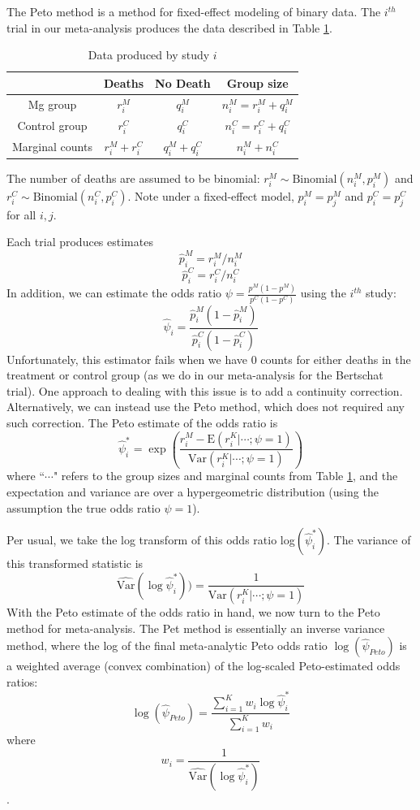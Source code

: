 \documentclass[fleqn,10pt]{SelfArx} %
\begin{document}
The Peto method is a method for fixed-effect modeling of binary data. The $i^{th}$ trial in our meta-analysis produces the data described in Table \ref{tab:sld}. 
\bgroup
\def\arraystretch{1.2}
\begin{table}[H]
\caption{Data produced by study $i$} \label{tab:sld}
\begin{center}
\begin{tabular}{| c | c | c | c |}
\hline
	& Deaths & No Death & Group size \\
\hline
Mg group &  $r_i^M$ & $q_i^M$ & $n_i^M = r_i^M + q_i^M$\\
\hline
Control group &  $r_i^C$ & $q_i^C$ & $n_i^C = r_i^C + q_i^C$  \\
\hline
Marginal counts & $r_i^M + r_i^C$ & $q_i^M + q_i^C$ & $n_i^M + n_i^C$ \\
\hline
\end{tabular}
\end{center}
\end{table}
\egroup
The number of deaths are assumed to be binomial: $r_i^M \sim \textrm{Binomial}(n_i^M, p_i^M)$ and $r_i^C \sim \textrm{Binomial}(n_i^C, p_i^C)$. Note under a fixed-effect model, $p_i^M = p_j^M$ and $p_i^C = p_j^C$ for all $i, j$.

Each trial produces estimates
\[\hat{p}_i^M = r_i^M/n_i^M\]
\[\hat{p}_i^C = r_i^C / n_i^C\]
In addition, we can estimate the odds ratio $\psi = \frac{p^M (1- p^M)}{p^C (1 - p^C)}$ using the $i^{th}$ study:
\[\hat{\psi}_i = \frac{\hat{p}_i^M(1-\hat{p}_i^M)}{\hat{p}_i^C(1-\hat{p}_i^C)}\]
Unfortunately, this estimator fails when we have 0 counts for either deaths in the treatment or control group (as we do in our meta-analysis for the Bertschat trial). One approach to dealing with this issue is to add a continuity correction. Alternatively, we can instead use the Peto method, which does not required any such correction. The Peto estimate of the odds ratio is
\[\hat{\psi}_i^* = \exp\left(\frac{r_i^M - \textrm{E}(r_i^K | \cdots; \psi = 1)}{\textrm{Var}(r_i^K | \cdots; \psi = 1)}\right)\]
where ``$\cdots$" refers to the group sizes and marginal counts from Table \ref{tab:sld}, and the expectation and variance are over a hypergeometric distribution (using the assumption the true odds ratio $\psi = 1$).

Per usual, we take the log transform of this odds ratio log$(\hat{\psi}_i^*)$. The variance of this transformed statistic is
\[\widehat{\textrm{Var}}(\log \hat{\psi}_i^*)) = \frac{1}{\textrm{Var}(r_i^K | \cdots; \psi = 1)}\]
With the Peto estimate of the odds ratio in hand, we now turn to the Peto method for meta-analysis. The Pet method is essentially an inverse variance method, where the log of the final meta-analytic Peto odds ratio $\log(\hat{\psi}_{Peto})$ is a weighted average (convex combination) of the log-scaled Peto-estimated odds ratios:
\[\log(\hat{\psi}_{Peto}) = \frac{\sum_{i = 1}^K w_i \log \hat{\psi}_i^*}{\sum_{i = 1}^K w_i} \]
where
\[w_i = \frac{1}{\widehat{\textrm{Var}}(\log \hat{\psi}_i^*)}\].
\end{document}

